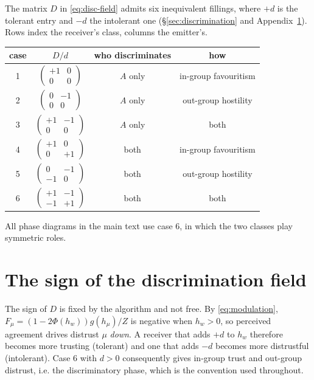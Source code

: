 \documentclass{article}
\newcommand{\hw}{h_{w}}
\newcommand{\hmu}{h_{\mu}}
\newcommand{\Fmu}{F_{\mu}}
\begin{document}
The matrix $D$ in \eqref{eq:disc-field} admits six inequivalent fillings, where
$+d$ is the tolerant entry and $-d$ the intolerant one (\S\ref{sec:discrimination}
and Appendix~\ref{app:sign}). Rows index the receiver's class, columns the
emitter's.

\newcommand{\dmat}[4]{\left(\begin{smallmatrix}#1&#2\\#3&#4\end{smallmatrix}\right)}

\begin{table}[h]
\centering\small
\begin{tabular}{cccc}
\toprule
case & $D/d$ & who discriminates & how \\
\midrule
1 & $\dmat{+1}{0}{0}{0}$   & $A$ only & in-group favouritism \\
2 & $\dmat{0}{-1}{0}{0}$   & $A$ only & out-group hostility \\
3 & $\dmat{+1}{-1}{0}{0}$  & $A$ only & both \\
4 & $\dmat{+1}{0}{0}{+1}$  & both     & in-group favouritism \\
5 & $\dmat{0}{-1}{-1}{0}$  & both     & out-group hostility \\
6 & $\dmat{+1}{-1}{-1}{+1}$ & both    & both \\
\bottomrule
\end{tabular}
\end{table}

All phase diagrams in the main text use case 6, in which the two classes play
symmetric roles.

\section{The sign of the discrimination field}
\label{app:sign}

The sign of $D$ is fixed by the algorithm and not free. By \eqref{eq:modulation},
$\Fmu=(1-2\Phi(\hw))g(\hmu)/Z$ is negative when $\hw>0$, so perceived agreement
drives distrust $\mu$ \emph{down}. A receiver that adds $+d$ to $\hw$ therefore
becomes more trusting (tolerant) and one that adds $-d$ becomes more distrustful
(intolerant). Case 6 with $d>0$ consequently gives in-group trust and out-group
distrust, i.e. the discriminatory phase, which is the convention used throughout.
\end{document}
